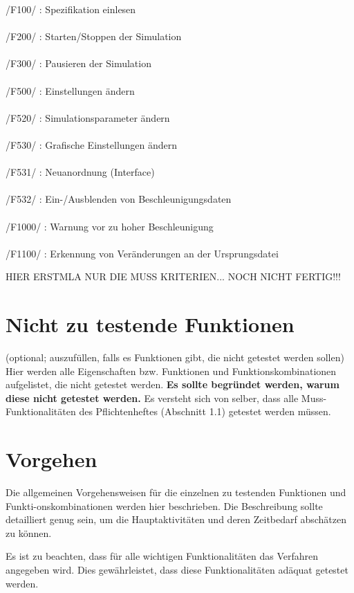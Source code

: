 /F100/ : Spezifikation einlesen\\
\\
/F200/ : Starten/Stoppen der Simulation\\
\\
/F300/ : Pausieren der Simulation\\
\\
/F500/ : Einstellungen ändern\\
\\
/F520/ : Simulationsparameter ändern\\
\\
/F530/ : Grafische Einstellungen ändern\\
\\
/F531/ : Neuanordnung (Interface)\\
\\
/F532/ : Ein-/Ausblenden von Beschleunigungsdaten\\
\\
/F1000/ : Warnung vor zu hoher Beschleunigung\\
\\
/F1100/ : Erkennung von Veränderungen an der Ursprungsdatei



HIER ERSTMLA NUR DIE MUSS KRITERIEN... NOCH NICHT FERTIG!!!

\section{Nicht zu testende Funktionen}
(optional; auszufüllen, falls es Funktionen gibt, die nicht getestet werden
sollen)\\

Hier werden alle Eigenschaften bzw. Funktionen und Funktionskombinationen
aufgelistet, die nicht getestet werden.
\textbf{ Es sollte begründet werden, warum diese nicht getestet werden.} Es
versteht sich von selber, dass alle Muss-Funktionalitäten des Pflichtenheftes
(Abschnitt 1.1) getestet werden müssen.

\section{Vorgehen}
Die allgemeinen Vorgehensweisen für die einzelnen zu testenden Funktionen und
Funkti-onskombinationen werden hier beschrieben. Die Beschreibung sollte
detailliert genug sein, um die Hauptaktivitäten und deren Zeitbedarf abschätzen
zu können.

Es ist zu beachten, dass für alle wichtigen Funktionalitäten das Verfahren
angegeben wird. Dies gewährleistet, dass diese Funktionalitäten adäquat
getestet werden.

